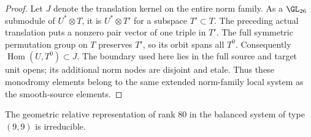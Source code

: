 \begin{proof}
Let $J$ denote the translation kernel on the entire norm
family. As a $\GL_{26}$ submodule of $U^*\otimes T$, it is
$U^*\otimes T'$ for a subspace $T'\subset T$.
The preceding actual translation puts a nonzero pair vector
of one triple in $T'$. The full symmetric permutation group
on $T$ preserves $T'$, so its orbit spans all $T^0$.
Consequently $\operatorname{Hom}(U,T^0)\subset J$.
The boundary used here lies in the full source and target
unit opens; its additional norm nodes are disjoint and etale.
Thus these monodromy elements belong to the same extended
norm-family local system as the smooth-source elements.
\end{proof}

\begin{lemma}
\label{lem:mixed-d3-common-partial-normalizations-candidate}
The geometric relative representation of rank $80$ in the
balanced system of type $(9,9)$ is irreducible.
\end{lemma}
